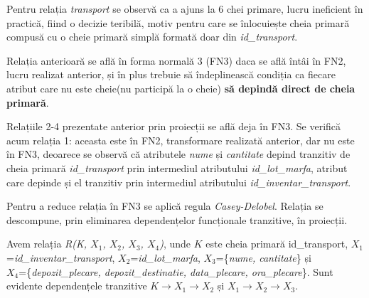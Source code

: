 \documentclass[12pt, a4paper]{article}
\begin{document}
\begin{table}[!htbp]
\begin{center}
\caption{Proiectia \emph{R4($K_4$, $Z$)}}\label{tab10-4}
\end{center}
\end{table}

Pentru relația \emph{transport} se observă ca a ajuns la 6 chei primare, lucru ineficient în practică, fiind o decizie teribilă, motiv pentru care se înlocuiește cheia primară compusă cu o cheie primară simplă formată doar din \emph{id\_transport}.

Relația anterioară se află în forma normală 3 (FN3) daca se află întâi în FN2, lucru realizat anterior, și în plus trebuie să îndeplinească condiția ca fiecare atribut care nu este cheie(nu participă la o cheie) \textbf{să depindă direct de cheia primară}.

Relațiile 2-4 prezentate anterior prin proiecții se află deja în FN3. Se verifică acum relația 1: aceasta este în FN2, transformare realizată anterior, dar nu este în FN3, deoarece se observă că atributele \emph{nume} și \emph{cantitate} depind tranzitiv de cheia primară \emph{id\_transport} prin intermediul atributului \emph{id\_lot\_marfa}, atribut care depinde și el tranzitiv prin intermediul atributului \emph{id\_inventar\_transport}.

Pentru a reduce relația în FN3 se aplică regula \emph{Casey-Delobel}. Relația se descompune, prin eliminarea dependențelor funcționale tranzitive, în proiecții.

Avem relația \emph{R(K, $X_1$, $X_2$, $X_3$, $X_4$)}, unde $K$ este cheia primară id\_transport, $X_1$=\emph{id\_inventar\_transport}, $X_2$=\emph{id\_lot\_marfa}, $X_3$=\{\emph{nume, cantitate}\} și\\ $X_4$=\{\emph{depozit\_plecare, depozit\_destinatie, data\_plecare, ora\_plecare}\}. Sunt \\evidente dependențele tranzitive $K\rightarrow X_1\rightarrow X_2$ și $X_1\rightarrow X_2\rightarrow X_3$.
\end{document}
